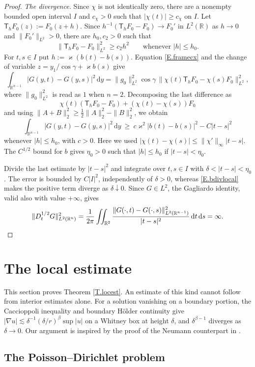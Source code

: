 \documentclass[12pt,leqno]{amsart}
\numberwithin{equation}{section}
\newcommand{\R}{\mathbb R}
\newcommand{\abs}[1]{\left\vert#1\right\vert}
\newcommand{\dhalf}{D_t^{1/2}}
\renewcommand{\d}{\,\mathrm d}
\theoremstyle{plain}
\theoremstyle{remark}
\begin{document}
\begin{proof}
\emph{The divergence.} Since $\chi$ is not identically zero, there are a
nonempty bounded open interval $I$ and $c_\chi>0$ such that
$|\chi(t)|\ge c_\chi$ on $I$. Let $\mathsf T_hF_0(z):=F_0(z+h)$.
Since $h^{-1}(\mathsf T_hF_0-F_0)\to F_0'$ in $L^2(\R)$ as $h\to0$ and
$\|F_0'\|_{L^2}>0$, there are $h_0,c_2>0$ such that
\[
 \|\mathsf T_hF_0-F_0\|_{L^2}^2\ge c_2h^2
 \qquad\text{whenever }|h|\le h_0.
\]
For $t,s\in I$ put $h:=\varkappa(b(t)-b(s))$. Equation \eqref{E.framecx}
and the change of variable $z=y_1/\cos\gamma+\varkappa b(s)$ give
\[
 \int_{\R^{n-1}}|G(y,t)-G(y,s)|^2\d y
 =\|g_0\|_{L^2}^2\cos\gamma\,
   \|\chi(t)\mathsf T_hF_0-\chi(s)F_0\|_{L^2}^2,
\]
where $\|g_0\|_{L^2}^2$ is read as $1$ when $n=2$. Decomposing the last
difference as
\[
 \chi(t)(\mathsf T_hF_0-F_0)+(\chi(t)-\chi(s))F_0
\]
and using $\|A+B\|_2^2\ge\tfrac12\|A\|_2^2-\|B\|_2^2$, we obtain
\[
 \int_{\R^{n-1}}|G(y,t)-G(y,s)|^2\d y
 \ \ge\ c\varkappa^2|b(t)-b(s)|^2-C|t-s|^2
\]
whenever $|h|\le h_0$, with $c>0$. Here we used
$|\chi(t)-\chi(s)|\le\|\chi'\|_\infty|t-s|$.
The $C^{1/2}$ bound for $b$ gives $\eta_0>0$ such that $|h|\le h_0$
if $|t-s|<\eta_0$.

Divide the last estimate by $|t-s|^2$ and integrate over
$t,s\in I$ with $\delta<|t-s|<\eta_0$. The error is bounded by
$C|I|^2$, independently of $\delta>0$, whereas \eqref{E.bdivlocal} makes
the positive term diverge as $\delta\downarrow0$. Since $G\in L^2$, the
Gagliardo identity, valid also with value $+\infty$, gives
\[
 \|\dhalf G\|_{L^2(\R^n)}^2
 =\frac1{2\pi}\iint_{\R^2}
   \frac{\|G(\cdot,t)-G(\cdot,s)\|_{L^2(\R^{n-1})}^2}{|t-s|^2}
   \d t\d s=\infty.\qedhere
\]
\end{proof}



\section{The local estimate}\label{S.loc}

This section proves Theorem \ref{T.locest}. An estimate of this kind cannot
follow from interior estimates alone. For a solution vanishing on a boundary
portion, the Caccioppoli inequality and boundary H\"older continuity give
$\abs{\nabla u}\lesssim\delta^{-1}(\delta/r)^\beta\sup\abs u$ on a Whitney box
at height $\delta$, and $\delta^{\beta-1}$ diverges as $\delta\to0$. Our
argument is inspired by the proof of the Neumann counterpart in
\cite[\S\S3--4]{DLP2}.

\subsection{The Poisson--Dirichlet problem}\label{ss.PD}
\end{document}
